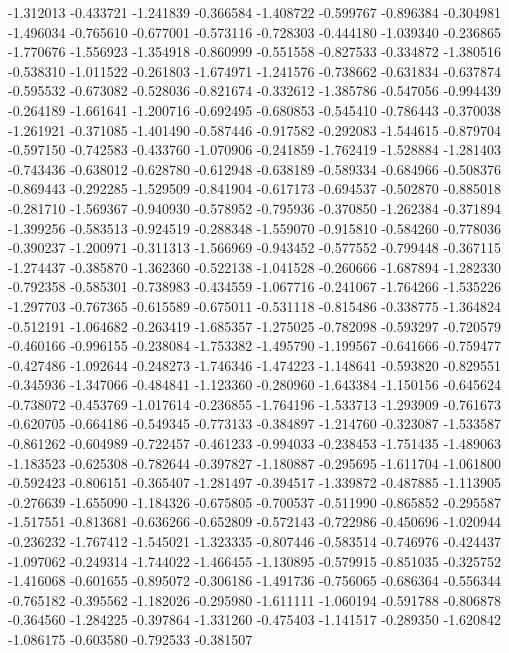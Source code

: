 -1.312013
-0.433721
-1.241839
-0.366584
-1.408722
-0.599767
-0.896384
-0.304981
-1.496034
-0.765610
-0.677001
-0.573116
-0.728303
-0.444180
-1.039340
-0.236865
-1.770676
-1.556923
-1.354918
-0.860999
-0.551558
-0.827533
-0.334872
-1.380516
-0.538310
-1.011522
-0.261803
-1.674971
-1.241576
-0.738662
-0.631834
-0.637874
-0.595532
-0.673082
-0.528036
-0.821674
-0.332612
-1.385786
-0.547056
-0.994439
-0.264189
-1.661641
-1.200716
-0.692495
-0.680853
-0.545410
-0.786443
-0.370038
-1.261921
-0.371085
-1.401490
-0.587446
-0.917582
-0.292083
-1.544615
-0.879704
-0.597150
-0.742583
-0.433760
-1.070906
-0.241859
-1.762419
-1.528884
-1.281403
-0.743436
-0.638012
-0.628780
-0.612948
-0.638189
-0.589334
-0.684966
-0.508376
-0.869443
-0.292285
-1.529509
-0.841904
-0.617173
-0.694537
-0.502870
-0.885018
-0.281710
-1.569367
-0.940930
-0.578952
-0.795936
-0.370850
-1.262384
-0.371894
-1.399256
-0.583513
-0.924519
-0.288348
-1.559070
-0.915810
-0.584260
-0.778036
-0.390237
-1.200971
-0.311313
-1.566969
-0.943452
-0.577552
-0.799448
-0.367115
-1.274437
-0.385870
-1.362360
-0.522138
-1.041528
-0.260666
-1.687894
-1.282330
-0.792358
-0.585301
-0.738983
-0.434559
-1.067716
-0.241067
-1.764266
-1.535226
-1.297703
-0.767365
-0.615589
-0.675011
-0.531118
-0.815486
-0.338775
-1.364824
-0.512191
-1.064682
-0.263419
-1.685357
-1.275025
-0.782098
-0.593297
-0.720579
-0.460166
-0.996155
-0.238084
-1.753382
-1.495790
-1.199567
-0.641666
-0.759477
-0.427486
-1.092644
-0.248273
-1.746346
-1.474223
-1.148641
-0.593820
-0.829551
-0.345936
-1.347066
-0.484841
-1.123360
-0.280960
-1.643384
-1.150156
-0.645624
-0.738072
-0.453769
-1.017614
-0.236855
-1.764196
-1.533713
-1.293909
-0.761673
-0.620705
-0.664186
-0.549345
-0.773133
-0.384897
-1.214760
-0.323087
-1.533587
-0.861262
-0.604989
-0.722457
-0.461233
-0.994033
-0.238453
-1.751435
-1.489063
-1.183523
-0.625308
-0.782644
-0.397827
-1.180887
-0.295695
-1.611704
-1.061800
-0.592423
-0.806151
-0.365407
-1.281497
-0.394517
-1.339872
-0.487885
-1.113905
-0.276639
-1.655090
-1.184326
-0.675805
-0.700537
-0.511990
-0.865852
-0.295587
-1.517551
-0.813681
-0.636266
-0.652809
-0.572143
-0.722986
-0.450696
-1.020944
-0.236232
-1.767412
-1.545021
-1.323335
-0.807446
-0.583514
-0.746976
-0.424437
-1.097062
-0.249314
-1.744022
-1.466455
-1.130895
-0.579915
-0.851035
-0.325752
-1.416068
-0.601655
-0.895072
-0.306186
-1.491736
-0.756065
-0.686364
-0.556344
-0.765182
-0.395562
-1.182026
-0.295980
-1.611111
-1.060194
-0.591788
-0.806878
-0.364560
-1.284225
-0.397864
-1.331260
-0.475403
-1.141517
-0.289350
-1.620842
-1.086175
-0.603580
-0.792533
-0.381507
